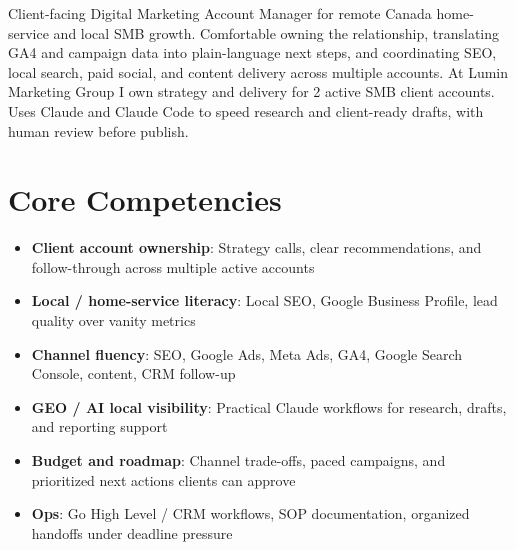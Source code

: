 \documentclass[11pt,a4paper,sans]{moderncv}
\begin{document}
\makecvtitle

\vspace{6pt}
\small{Client-facing Digital Marketing Account Manager for remote Canada home-service and local SMB growth. Comfortable owning the relationship, translating GA4 and campaign data into plain-language next steps, and coordinating SEO, local search, paid social, and content delivery across multiple accounts. At Lumin Marketing Group I own strategy and delivery for 2 active SMB client accounts. Uses Claude and Claude Code to speed research and client-ready drafts, with human review before publish.}

\section{Core Competencies}
\vspace{1pt}
\begin{itemize}
\item \textbf{Client account ownership}: Strategy calls, clear recommendations, and follow-through across multiple active accounts
\item \textbf{Local / home-service literacy}: Local SEO, Google Business Profile, lead quality over vanity metrics
\item \textbf{Channel fluency}: SEO, Google Ads, Meta Ads, GA4, Google Search Console, content, CRM follow-up
\item \textbf{GEO / AI local visibility}: Practical Claude workflows for research, drafts, and reporting support
\item \textbf{Budget and roadmap}: Channel trade-offs, paced campaigns, and prioritized next actions clients can approve
\item \textbf{Ops}: Go High Level / CRM workflows, SOP documentation, organized handoffs under deadline pressure
\end{itemize}
\end{document}
